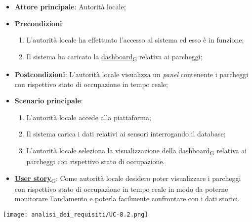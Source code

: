 \begin{itemize}
	\item \textbf{Attore principale}: Autorità locale;
	\item \textbf{Precondizioni}:
	      \begin{enumerate}
		      \item L'autorità locale ha effettuato l'accesso al sistema ed esso è in funzione;
		      \item Il sistema ha caricato la \href{https://7last.github.io/docs/rtb/documentazione-interna/glossario\#dashboard}{dashboard\textsubscript{G}} relativa ai parcheggi;
	      \end{enumerate}
	\item \textbf{Postcondizioni}: L'autorità locale visualizza un \textit{panel} contenente i parcheggi con rispettivo stato di occupazione in tempo reale;
	\item \textbf{Scenario principale}:
	      \begin{enumerate}
		      \item L'autorità locale accede alla piattaforma;
		      \item Il sistema carica i dati relativi ai sensori interrogando il database;
		      \item L'autorità locale seleziona la visualizzazione della \href{https://7last.github.io/docs/rtb/documentazione-interna/glossario\#dashboard}{dashboard\textsubscript{G}} relativa ai parcheggi con rispettivo stato di occupazione.
	      \end{enumerate}
	\item \href{https://7last.github.io/docs/rtb/documentazione-interna/glossario\#user-story}{\textbf{User story}\textsubscript{G}}:
	      Come autorità locale desidero poter visualizzare i parcheggi con rispettivo stato di occupazione in tempo reale in modo da poterne monitorare l'andamento
	      e poterla facilmente confrontare con i dati storici.
\end{itemize}
\begin{center}
	\texttt{[image: analisi\_dei\_requisiti/UC-8.2.png]}
\end{center}

